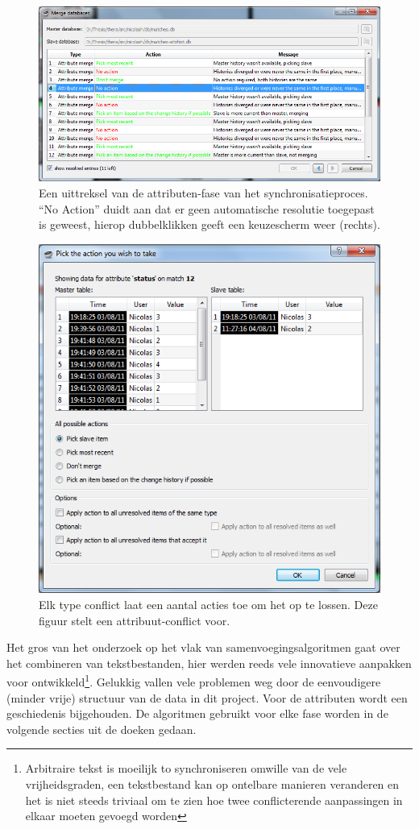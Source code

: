 \begin{figure}[ht]
	\begin{center}
		\includegraphics[width=1.0\columnwidth]{images/merge-action-1-small.png}
		\caption{Een uittreksel van de attributen-fase van het synchronisatieproces. ``No Action''  duidt aan dat er geen automatische resolutie toegepast is geweest, hierop dubbelklikken geeft een keuzescherm weer (rechts).}
		\label{fig:merge-attrib}
	\end{center}
\end{figure}

\begin{figure}[ht]
	\begin{center}
		\includegraphics[width=0.5\columnwidth]{images/merge-action-2-small.png}
		\caption{Elk type conflict laat een aantal acties toe om het op te lossen. Deze figuur stelt een attribuut-conflict voor.}
		\label{fig:merge-choose}
	\end{center}
\end{figure}

Het gros van het onderzoek op het vlak van samenvoegingsalgoritmen gaat over het combineren van tekstbestanden, hier werden reeds vele innovatieve aanpakken voor ontwikkeld\footnote{Arbitraire tekst is moeilijk to synchroniseren omwille van de vele vrijheidsgraden, een tekstbestand kan op ontelbare manieren veranderen en het is niet steeds triviaal om te zien hoe twee conflicterende aanpassingen in elkaar moeten gevoegd worden}. Gelukkig vallen vele problemen weg door de eenvoudigere (minder vrije) structuur van de data in dit project. Voor de attributen wordt een geschiedenis bijgehouden. De algoritmen gebruikt voor elke fase worden in de volgende secties uit de doeken gedaan.

